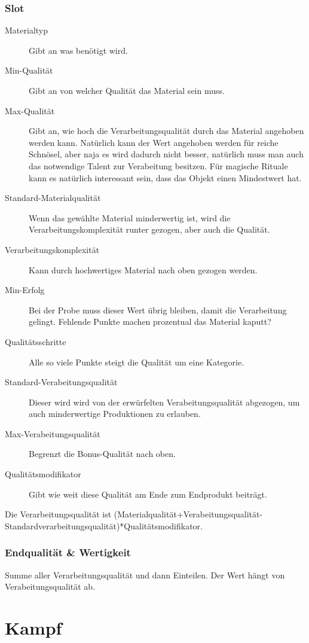 \documentclass[a4paper,12pt,oneside]{book}
\begin{document}
\section{Slot}
\begin{description}
\item[Materialtyp]Gibt an was benötigt wird.
\item[Min-Qualität]Gibt an von welcher Qualität das Material sein muss.
\item[Max-Qualität]Gibt an, wie hoch die Verarbeitungsqualität durch das Material angehoben werden kann. Natürlich kann der Wert angehoben werden für reiche Schnösel, aber naja es wird dadurch nicht besser, natürlich muss man auch das notwendige Talent zur Verabeitung besitzen. Für magische Rituale kann es natürlich interessant sein, dass das Objekt einen Mindestwert hat.
\item[Standard-Materialqualität]Wenn das gewählte Material minderwertig ist, wird die Verarbeitungskomplexität runter gezogen, aber auch die Qualität.
\item[Verarbeitungskomplexität]Kann durch hochwertiges Material nach oben gezogen werden.
\item[Min-Erfolg]Bei der Probe muss dieser Wert übrig bleiben, damit die Verarbeitung gelingt. Fehlende Punkte machen prozentual das Material kaputt?
\item[Qualitätsschritte]Alle so viele Punkte steigt die Qualität um eine Kategorie.
\item[Standard-Verabeitungsqualität]Dieser wird wird von der erwürfelten Verabeitungsqualität abgezogen, um auch minderwertige Produktionen zu erlauben.
\item[Max-Verabeitungsqualität]Begrenzt die Bonus-Qualität nach oben.
\item[Qualitätsmodifikator]Gibt wie weit diese Qualität am Ende zum Endprodukt beiträgt.
\end{description}
Die Verarbeitungsqualität ist (Materialqualität+Verabeitungsqualität-Standardverarbeitungsqualität)*Qualitätsmodifikator.
\section{Endqualität \& Wertigkeit}
Summe aller Verarbeitungsqualität und dann Einteilen. Der Wert hängt von Verabeitungsqualität ab.
\part{Kampf}
\setcounter{chapter}{0}
\end{document}
